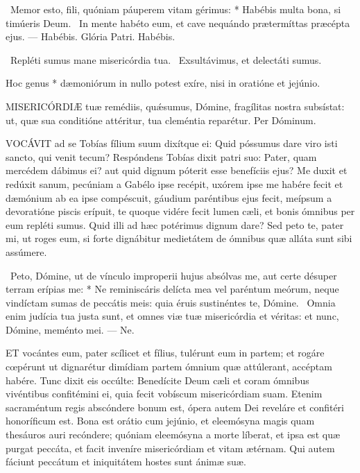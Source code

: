 \R\ Memor esto, fili, quóniam páuperem vitam gérimus: * Habébis multa bona, si timúeris Deum. \V\ In mente habéto eum, et cave nequándo prætermíttas præcépta ejus. — Habébis. Glória Patri. Habébis.


\V\ Repléti sumus mane misericórdia tua. \R\ Exsultávimus, et delectáti sumus.

 Hoc genus * dæmoniórum in nullo potest exíre, nisi in oratióne et jejúnio.


\lettrine[lines=2]{M}{ISERICÓRDIÆ} tuæ remédiis, quǽsumus, Dómine, fragílitas nostra subsístat: ut, quæ sua conditióne attéritur, tua cleméntia reparétur. Per Dóminum.





\lettrine[lines=2]{V}{OCÁVIT} ad se Tobías fílium suum dixítque ei: Quid póssumus dare viro isti sancto, qui venit tecum? Respóndens Tobías dixit patri suo: Pater, quam mercédem dábimus ei? aut quid dignum póterit esse benefíciis ejus? Me duxit et redúxit sanum, pecúniam a Gabélo ipse recépit, uxórem ipse me habére fecit et dæmónium ab ea ipse compéscuit, gáudium paréntibus ejus fecit, meípsum a devoratióne piscis erípuit, te quoque vidére fecit lumen cæli, et bonis ómnibus per eum repléti sumus. Quid illi ad hæc potérimus dignum dare? Sed peto te, pater mi, ut roges eum, si forte dignábitur medietátem de ómnibus quæ alláta sunt sibi assúmere.

\R\ Peto, Dómine, ut de vínculo improperii hujus absólvas me, aut certe désuper terram erípias me: * Ne reminiscáris delícta mea vel paréntum meórum, neque vindíctam sumas de peccátis meis: quia éruis sustinéntes te, Dómine. \V\ Omnia enim judícia tua justa sunt, et omnes viæ tuæ misericórdia et véritas: et nunc, Dómine, meménto mei. — Ne.


\lettrine[lines=2]{E}{T} vocántes eum, pater scílicet et fílius, tulérunt eum in partem; et rogáre cœpérunt ut dignarétur dimídiam partem ómnium quæ attúlerant, accéptam habére. Tunc dixit eis occúlte: Benedícite Deum cæli et coram ómnibus vivéntibus confitémini ei, quia fecit vobíscum misericórdiam suam. Etenim sacraméntum regis abscóndere bonum est, ópera autem Dei reveláre et confitéri honoríficum est. Bona est orátio cum jejúnio, et eleemósyna magis quam thesáuros auri recóndere; quóniam eleemósyna a morte líberat, et ipsa est quæ purgat peccáta, et facit inveníre misericórdiam et vitam ætérnam. Qui autem fáciunt peccátum et iniquitátem hostes sunt ánimæ suæ.

